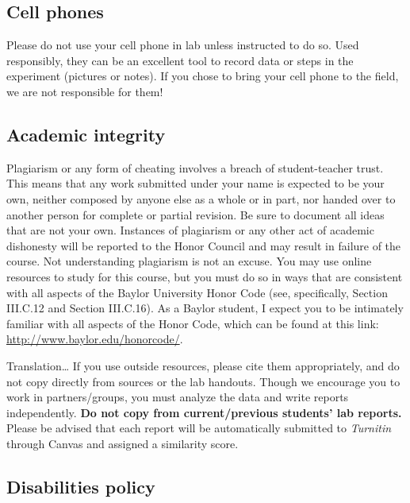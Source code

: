 \documentclass[11pt,]{article}
\begin{document}
\hypertarget{cell-phones}{%
\subsection{Cell phones}\label{cell-phones}}

Please do not use your cell phone in lab unless instructed to do so.
Used responsibly, they can be an excellent tool to record data or steps
in the experiment (pictures or notes). If you chose to bring your cell
phone to the field, we are not responsible for them!

\hypertarget{academic-integrity}{%
\subsection{Academic integrity}\label{academic-integrity}}

Plagiarism or any form of cheating involves a breach of student-teacher
trust. This means that any work submitted under your name is expected to
be your own, neither composed by anyone else as a whole or in part, nor
handed over to another person for complete or partial revision. Be sure
to document all ideas that are not your own. Instances of plagiarism or
any other act of academic dishonesty will be reported to the Honor
Council and may result in failure of the course. Not understanding
plagiarism is not an excuse. You may use online resources to study for
this course, but you must do so in ways that are consistent with all
aspects of the Baylor University Honor Code (see, specifically, Section
III.C.12 and Section III.C.16). As a Baylor student, I expect you to be
intimately familiar with all aspects of the Honor Code, which can be
found at this link: \url{http://www.baylor.edu/honorcode/}.

Translation\ldots{} If you use outside resources, please cite them
appropriately, and do not copy directly from sources or the lab
handouts. Though we encourage you to work in partners/groups, you must
analyze the data and write reports independently. \textbf{Do not copy
from current/previous students' lab reports.} Please be advised that
each report will be automatically submitted to \emph{Turnitin} through
Canvas and assigned a similarity score.

\hypertarget{disabilities-policy}{%
\subsection{Disabilities policy}\label{disabilities-policy}}
\end{document}
